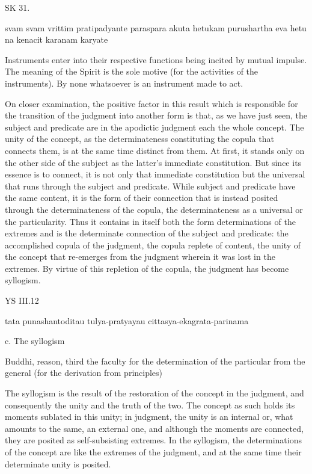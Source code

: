 SK 31.

svam svam vrittim pratipadyante paraspara akuta hetukam
purushartha eva hetu na kenacit karanam karyate

Instruments enter into their respective functions being incited by mutual impulse.
The meaning of the Spirit is the sole motive (for the activities of the instruments).
By none whatsoever is an instrument made to act.

On closer examination, the positive factor in this result
which is responsible for the transition of the judgment into
another form is that, as we have just seen,
the subject and predicate are in the apodictic judgment each the whole concept.
The unity of the concept, as the determinateness constituting
the copula that connects them, is at the same time distinct from them.
At first, it stands only on the other side of the subject as
the latter’s immediate constitution.
But since its essence is to connect,
it is not only that immediate constitution but
the universal that runs through the subject and predicate.
While subject and predicate have the same content,
it is the form of their connection that is instead posited
through the determinateness of the copula,
the determinateness as a universal or the particularity.
Thus it contains in itself both the form determinations of
the extremes and is the determinate connection of the subject and predicate:
the accomplished copula of the judgment, the copula replete of content,
the unity of the concept that re-emerges from the judgment
wherein it was lost in the extremes.
By virtue of this repletion of the copula, the judgment has become syllogism.

YS III.12

tata punashantoditau tulya-pratyayau cittasya-ekagrata-parinama

c. The syllogism

Buddhi, reason, third the faculty for the determination of
the particular from the general (for the derivation from principles)

The syllogism is the result of the restoration of the concept in the judgment,
and consequently the unity and the truth of the two. The concept as such
holds its moments sublated in this unity; in judgment, the unity is an
internal or, what amounts to the same, an external one, and although the
moments are connected, they are posited as self-subsisting extremes. In the
syllogism, the determinations of the concept are like the extremes of
the judgment, and at the same time their determinate unity is posited.

